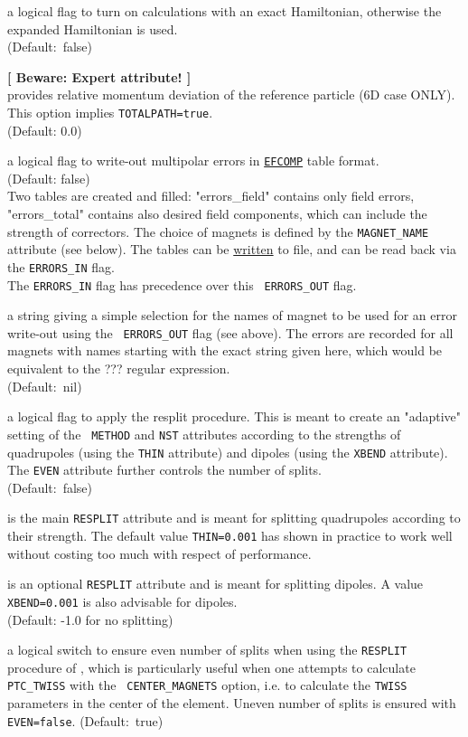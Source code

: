 \begin{madlist}
   a logical flag to turn on calculations with an exact
  Hamiltonian, otherwise the expanded Hamiltonian is used. \\
  (Default:~false)

   {\bf [ Beware: Expert attribute! ]}\\
  provides relative momentum deviation of the reference particle (6D case
  ONLY). This option implies {\tt TOTALPATH=true}. \\
  (Default: 0.0)
  
   a logical flag to write-out multipolar errors
  in \hyperref[sec:efcomp]{\tt EFCOMP} table format. 
  \\ (Default: false) \\
  Two tables are created and filled: "errors\_field" contains only
  field errors, "errors\_total" contains also desired field
  components, which can include the strength of correctors.  
  The choice of magnets is defined by the {\tt MAGNET\_NAME}
  attribute (see below). 
  The tables can be \hyperref[sec:write]{written} to file, and can be
  read back via the {\tt ERRORS\_IN} flag.\\ 
  The {\tt ERRORS\_IN} flag has precedence over this {\tt
    ERRORS\_OUT} flag.    

   a string giving a simple selection for the
  names of magnet to be used for an error write-out using the {\tt
    ERRORS\_OUT} flag (see above). The errors are recorded for all
  magnets with names starting with the exact string given here, which
  would be equivalent to the ??? regular expression.\\ 
  (Default:~nil)
  
   a logical flag to apply the \ptc resplit
  procedure. This is meant to create an "adaptive" setting of the {\tt
    METHOD} and {\tt NST} attributes according to the strengths of
  quadrupoles (using the {\tt THIN}  attribute) and dipoles (using the
  {\tt XBEND} attribute). The {\tt EVEN} attribute further controls the
  number of splits.  \\
  (Default:~false) 

   is the main {\tt RESPLIT} attribute and is meant for
  splitting quadrupoles according to their strength. The default value
  {\tt THIN=0.001} has shown in practice to work well without costing
  too much with respect of performance.
  
   is an optional {\tt RESPLIT} attribute and is meant for
  splitting dipoles. A value {\tt XBEND=0.001} is also advisable for
  dipoles. \\  
  (Default: -1.0 for no splitting)

   a logical switch to ensure even number of splits when
  using the {\tt RESPLIT}  procedure of \ptc, which is particularly
  useful when one attempts to calculate {\tt PTC\_TWISS} with the {\tt
    CENTER\_MAGNETS} option, i.e. to calculate the {\tt TWISS}
  parameters in the center of the element. 
  Uneven number of splits is ensured with {\tt EVEN=false}.  
  (Default:~true) \\
\end{madlist}
  

